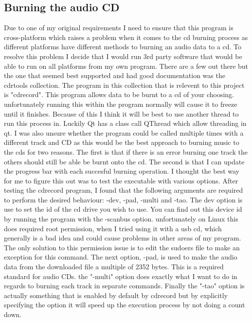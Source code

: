 \documentclass{article}
\begin{document}
\subsection{Burning the audio CD}
Due to one of my original requirements I need to ensure that this program is cross-platform
which raises a problem when it comes to the cd burning process as different platforms have
different methods to burning an audio data to a cd. To resolve this problem I decide that
I would run 3rd party software that would be able to run on all platforms from my own
program. There are a few out there but the one that seemed best supported and had good
documentation was the cdrtools collection. The program in this collection that is relevent
to this project is "cdrecord". This program allows data to be burnt to a cd of your choosing.
unfortunately running this within the program normally will cause it to freeze until it finishes.
Because of this I think it will be best to use another thread to run this process in. Luckily
Qt has a class call QThread which allow threading in qt.
I was also unsure whether the program could be called multiple times with a different track
and CD as this would be the best approach to burning music to the cds for two reasons. The
first is that if there is an error burning one track the others should still be able be burnt
onto the cd. The second is that I can update the progress bar with each succesful burning operation.
I thought the best way for me to figure this out was to test the executable with various options.
After testing the cdrecord program, I found that the following arguments are required to perform the
desired behaviour: -dev, -pad, -multi and -tao. The dev option is use to set the id of the
cd drive you wish to use. You can find out this device id by running the program with the -scanbus
option. unfortunately on Linux this does required root permission, when I tried using it with a
usb cd, which generally is a bad idea and could cause problems in other areas of my program. The
only solution to this permission issue is to edit the sudoers file to make an exception for this
command. The next option, -pad, is used to make the audio data from the downloaded file a multiple
of 2352 bytes. This is a required standard for audio CDs. the "-multi" option does exactly what
I want to do in regards to burning each track in separate commands. Finally the "-tao" option is
actually something that is enabled by default by cdrecord but by explicitly specifying the option
it will speed up the execution process by not doing a count down.
\end{document}
